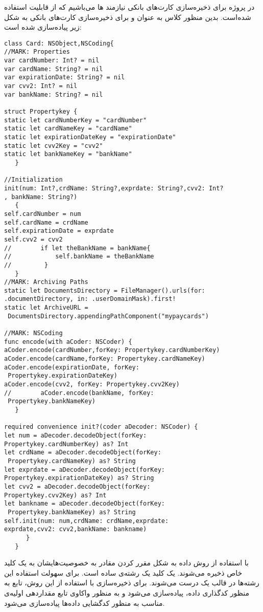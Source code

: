 \documentclass[oneside]{report}
\begin{document}
در پروژه برای ذخیره‌سازی کارت‌های بانکی نیازمند 
{\normalsize {}}
ها می‌باشیم که از قابلیت 
{\normalsize {}}
استفاده شده‌است. بدین منظور کلاس 
{\normalsize {}}
به عنوان 
{\normalsize {}}
و برای ذخیره‌سازی کارت‌های بانکی به شکل زیر پیاده‌سازی شده است:‌
	\begin{latin}
	\begin{verbatim}
class Card: NSObject,NSCoding{
//MARK: Properties
var cardNumber: Int? = nil
var cardName: String? = nil
var expirationDate: String? = nil
var cvv2: Int? = nil
var bankName: String? = nil

struct Propertykey {
static let cardNumberKey = "cardNumber"
static let cardNameKey = "cardName"
static let expirationDateKey = "expirationDate"
static let cvv2Key = "cvv2"
static let bankNameKey = "bankName"
   }

//Initialization
init(num: Int?,crdName: String?,exprdate: String?,cvv2: Int?
, bankName: String?)
   {
self.cardNumber = num
self.cardName = crdName
self.expirationDate = exprdate
self.cvv2 = cvv2
//        if let theBankName = bankName{
//            self.bankName = theBankName
//         }
   }
//MARK: Archiving Paths
static let DocumentsDirectory = FileManager().urls(for: 
.documentDirectory, in: .userDomainMask).first!
static let ArchiveURL =
 DocumentsDirectory.appendingPathComponent("mypaycards")

//MARK: NSCoding
func encode(with aCoder: NSCoder) {
aCoder.encode(cardNumber,forKey: Propertykey.cardNumberKey)
aCoder.encode(cardName,forKey: Propertykey.cardNameKey)
aCoder.encode(expirationDate, forKey:
 Propertykey.expirationDateKey)
aCoder.encode(cvv2, forKey: Propertykey.cvv2Key)
//        aCoder.encode(bankName, forKey:
 Propertykey.bankNameKey)
   }

required convenience init?(coder aDecoder: NSCoder) {
let num = aDecoder.decodeObject(forKey: 
Propertykey.cardNumberKey) as? Int
let crdName = aDecoder.decodeObject(forKey:
 Propertykey.cardNameKey) as? String
let exprdate = aDecoder.decodeObject(forKey: 
Propertykey.expirationDateKey) as? String
let cvv2 = aDecoder.decodeObject(forKey: 
Propertykey.cvv2Key) as? Int
let bankname = aDecoder.decodeObject(forKey:
 Propertykey.bankNameKey) as? String
self.init(num: num,crdName: crdName,exprdate: 
exprdate,cvv2: cvv2,bankName: bankname)
      }
   }
	\end{verbatim}
	
\end{latin}		
با استفاده از روش
{\normalsize {}}
داده به شکل مقرر کردن مقادر به خصوصیت‌هایشان 
به یک کلید خاص ذخیره می‌شوند. یک کلید یک رشته‌ی ساده است. برای سهولت استفاده این رشته‌ها در قالب یک 
{\normalsize {}}
				       	درست می‌شوند. برای ذخیره‌سازی با استفاده از این روش، تابع 
				       	{\normalsize {}}
	به منظور کدگذاری داده، پیاده‌سازی می‌شود و به منظور واکاوی تابع مقداردهی اولیه‌ی 
	مناسب به منظور کدگشایی داده‌ها پیاده‌سازی می‌شود. 
	
\end{document}
